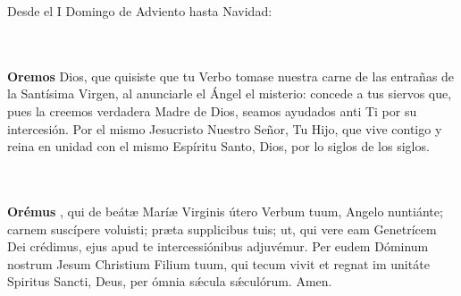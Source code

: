 \documentclass[10pt,a4paper,oneside]{book}
\begin{document}
\noindent\small{Desde el I Domingo de Adviento hasta Navidad:}\\
\begin{minipage}[t]{0.475\textwidth}
      \\\\
      \textbf{Oremos}
       Dios, que quisiste que tu Verbo tomase nuestra carne de las entrañas de la Santísima Virgen, al anunciarle el Ángel el misterio: concede a tus siervos que, pues
      la creemos verdadera Madre de Dios, seamos ayudados anti Ti por su intercesión. Por el mismo Jesucristo Nuestro Señor, Tu Hijo, que vive contigo y reina en unidad con el mismo Espíritu
      Santo, Dios, por lo siglos de los siglos.
\end{minipage}
\begin{minipage}[t]{0.475\textwidth}
      \\\\
      \textbf{Orémus}
      , qui de beát{\ae} Marí{\ae} Virginis útero Verbum tuum, Angelo nuntiánte; carnem suscípere voluisti; pr{\ae}ta supplicibus tuis; ut, qui vere eam Genetrícem
      Dei crédimus, ejus apud te intercessiónibus adjuvémur. Per eudem Dóminum nostrum Jesum Christium Filium tuum, qui tecum vivit et regnat im unitáte Spiritus Sancti, Deus, per ómnia
      s{\'\ae}cula s{\'\ae}culórum. Amen.
\end{minipage}

\bigskip
\end{document}
